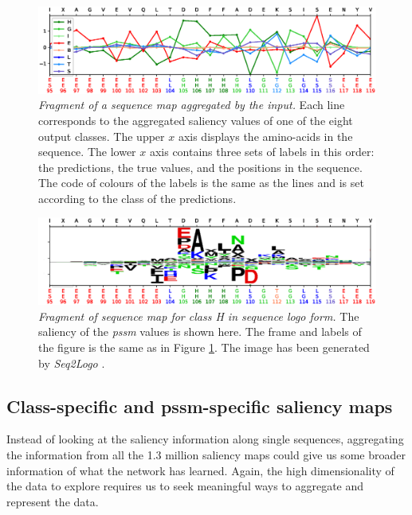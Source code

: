 \begin{figure}
	\centering
	\includegraphics[width=1\linewidth]{Figures/sample_8classes}
	\caption{\textit{Fragment of a sequence map aggregated by the input.} Each line corresponds to the aggregated saliency values of one of the eight output classes. The upper $x$ axis displays the amino-acids in the sequence. The lower $x$ axis contains three sets of labels in this order: the predictions, the true values, and the positions in the sequence. The code of colours of the labels is the same as the lines and is set according to the class of the predictions.}
	\label{fig:sample_8classes}
\end{figure}

\begin{figure}
	\centering
	\includegraphics[width=1\linewidth]{Figures/sample_Hclass}
	\caption{\textit{Fragment of sequence map for class H in sequence logo form.} The saliency of the \textit{pssm} values is shown here. The frame and labels of the figure is the same as in Figure \ref{fig:sample_8classes}. The image has been generated by \textit{Seq2Logo} \cite{Thomsen2012}.}
	\label{fig:sample_Hclass}
\end{figure}



\subsection{Class-specific and pssm-specific saliency maps}
Instead of looking at the saliency information along single sequences, aggregating the information from all the 1.3 million saliency maps could give us some broader information of what the network has learned. Again, the high dimensionality of the data to explore requires us to seek meaningful ways to aggregate and represent the data.

